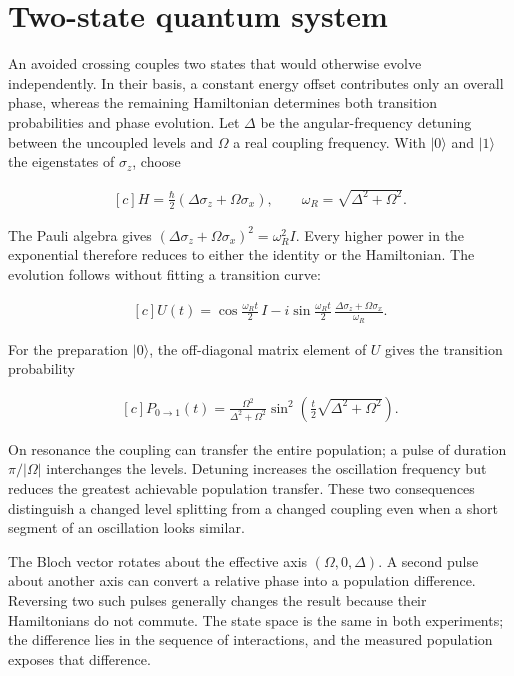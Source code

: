 \documentclass[11pt,oneside]{book}
\newenvironment{centeredalign}{\[\begin{gathered}[c]}{\end{gathered}\]}
\begin{document}
\clearpage

\section{Two-state quantum system}

\label{topic:two-state-quantum-system}

An avoided crossing couples two states that would otherwise evolve independently. In their basis, a constant energy offset contributes only an overall phase, whereas the remaining Hamiltonian determines both transition probabilities and phase evolution. Let \(\Delta\) be the angular-frequency detuning between the uncoupled levels and \(\Omega\) a real coupling frequency. With \(|0\rangle\) and \(|1\rangle\) the eigenstates of \(\sigma_z\), choose

\begin{centeredalign}
H=\frac{\hbar}{2}(\Delta\sigma_z+\Omega\sigma_x),\qquad \omega_R=\sqrt{\Delta^2+\Omega^2}.
\end{centeredalign}

The Pauli algebra gives \((\Delta\sigma_z+\Omega\sigma_x)^2=\omega_R^2I\). Every higher power in the exponential therefore reduces to either the identity or the Hamiltonian. The evolution follows without fitting a transition curve:

\begin{centeredalign}
U(t)=\cos\frac{\omega_Rt}{2}\,I-i\sin\frac{\omega_Rt}{2}\,
\frac{\Delta\sigma_z+\Omega\sigma_x}{\omega_R}.
\end{centeredalign}

For the preparation \(|0\rangle\), the off-diagonal matrix element of \(U\) gives the transition probability

\begin{centeredalign}
P_{0\to1}(t)=\frac{\Omega^2}{\Delta^2+\Omega^2}
\sin^2\!\left(\frac{t}{2}\sqrt{\Delta^2+\Omega^2}\right).
\end{centeredalign}

On resonance the coupling can transfer the entire population; a pulse of duration \(\pi/|\Omega|\) interchanges the levels. Detuning increases the oscillation frequency but reduces the greatest achievable population transfer. These two consequences distinguish a changed level splitting from a changed coupling even when a short segment of an oscillation looks similar.

The Bloch vector rotates about the effective axis \((\Omega,0,\Delta)\). A second pulse about another axis can convert a relative phase into a population difference. Reversing two such pulses generally changes the result because their Hamiltonians do not commute. The state space is the same in both experiments; the difference lies in the sequence of interactions, and the measured population exposes that difference.
\end{document}
